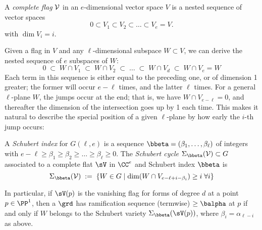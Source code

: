 \begin{definition}
A \emph{complete flag} $\cal V$  in an $e$-dimensional vector space $V$ is a nested sequence of vector spaces
$$
0 \subset V_1 \subset V_2 \subset \dots  \subset V_{e} = V.
$$
with $\dim V_i = i$.
\end{definition}

Given a flag in $V$ and any  $\ell$-dimensional subspace $W \subset V$, we can derive the nested sequence of $e$ subspaces of $W$:
$$
0 \; \subset \; W \cap V_1 \; \subset \;  W \cap V_2 \; \subset \;  \dots \; \subset \;  W \cap V_d \; \subset \;  W \cap V_{e} = W
$$
Each term in this sequence is either equal to the preceding one, or of dimension 1 greater; the former will occur $e-\ell$ times, and the latter $\ell$ times. For a general $\ell $-plane $W$, the jumps occur at the end; that is, we have $W \cap V_{e-\ell} = 0$, and thereafter the dimension of the intersection goes up by 1 each time. This makes it natural
to describe the special position of a given $\ell $-plane by how early the $i$-th jump occurs: 

\begin{definition}
A \emph{Schubert index} for $G(\ell, e)$ is a sequence ${\bbeta} = (\beta_1,\dots,\beta_{\ell})$ of integers with $e-\ell \geq \beta_1 \geq \beta_2 \geq \dots \geq \beta_{\ell} \geq 0$.
The \emph{Schubert cycle $\Sigma_{\bbeta}({\cal V}) \subset G$} associated to a complete flat $\sV$ in $\CC^e$ and
Schubert index $\bbeta$  is 
$$
\Sigma_{\bbeta}({\cal V}) \; := \; \left\{ W \in G \mid \dim(W \cap V_{e-\ell+i-\beta_i}) \geq i \; \forall i \right\}
$$
\end{definition}
In particular, if $\sV(p)$ is the vanishing flag for forms of degree $d$ at a point $p\in \PP^{1}$, then
a $\grd$ has ramification sequence (termwise) $\geq \balpha$ at $p$ if and only if $W$ belongs
to the Schubert variety $\Sigma_{\bbeta}(\sV(p))$, where $\beta_{i} = \alpha_{\ell-i}$ as above.



